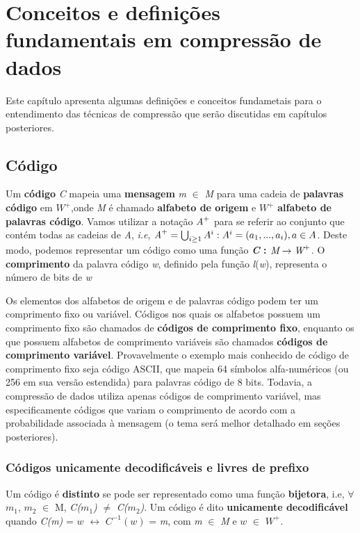 \chapter{Conceitos e definições fundamentais em compressão de dados}
Este capítulo apresenta algumas definições e conceitos fundametais para o entendimento das técnicas de compressão que serão discutidas em capítulos posteriores.

\section{Código}

Um \textbf{código} \emph{C} mapeia uma \textbf{mensagem} \emph{m} $\in$ \emph{M} para uma cadeia de \textbf{palavras código} em \emph{$W^+$},onde \emph{M} é chamado \textbf{alfabeto de origem} e \emph{$W^+$} \textbf{alfabeto de palavras código}. Vamos utilizar a notação $\emph{A}^+$ para se referir ao conjunto que contém todas as cadeias de \emph{A}, \emph{i.e}, $\emph{A}^+ = \bigcup_{i \geq 1}^{}A^{i} : A^i = (a_1,...,a_i), a \in A $. Deste modo, podemos representar um código como uma função \textbf{\emph{C} : $\emph{M} \rightarrow \emph{W}^+$}.  O \textbf{comprimento} da palavra código \emph{w}, definido pela função \emph{l}(\emph{w}), representa o número de bits de \emph{w}

Os elementos dos alfabetos de origem e de palavras código podem ter um comprimento fixo ou variável. Códigos nos quais os alfabetos possuem um comprimento fixo são chamados de \textbf{códigos de comprimento fixo}, enquanto os que possuem alfabetos de comprimento variáveis são chamados \textbf{códigos de comprimento variável}. Provavelmente o exemplo mais conhecido de código de comprimento fixo seja código ASCII, que mapeia 64 símbolos alfa-numéricos (ou 256 em sua versão estendida) para palavras código de 8 bits. Todavia, a compressão de dados utiliza apenas códigos de comprimento variável, mas especificamente códigos que variam o comprimento de acordo com a probabilidade associada à mensagem (o tema será melhor detalhado em seções posteriores). 

\subsection{Códigos unicamente decodificáveis e livres de prefixo}
Um código é \textbf{distinto} se pode ser representado como uma função \textbf{bijetora}, i.e, $\forall$ $m_1$, $m_2$ $\in$ M, \emph{C($m_1$)} $\neq$ \emph{C($m_2$)}. Um código é dito \textbf{unicamente decodificável} quando \emph{C(m)} = $w$ $\leftrightarrow$ \emph{$C^{-1}(w)$} = \emph{m}, com \emph{m} $\in$ \emph{M} e \emph{$w$} $\in$ $W^+$.

